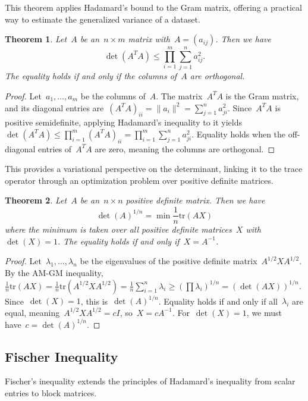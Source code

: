 \documentclass[12pt]{article}
\newtheorem{theorem}{Theorem}[section]
\begin{document}
\noindent This theorem applies Hadamard's bound to the Gram matrix, offering a practical way to estimate the generalized variance of a dataset.
\begin{theorem}
Let~$A$ be an~$n \times m$ matrix with~$A = (a_{ij})$. Then we have
\[ \det(A^T A) \le \prod_{i=1}^m \sum_{j=1}^n a_{ij}^2. \]
The equality holds if and only if the columns of~$A$ are orthogonal.
\end{theorem}
\begin{proof}
Let~$a_1, \dots, a_m$ be the columns of~$A$. The matrix~$A^T A$ is the Gram matrix, and its diagonal entries are~$(A^T A)_{ii} = \|a_i\|^2 = \sum_{j=1}^n a_{ji}^2$. Since~$A^T A$ is positive semidefinite, applying Hadamard's inequality to it yields~$\det(A^T A) \le \prod_{i=1}^m (A^T A)_{ii} = \prod_{i=1}^m \sum_{j=1}^n a_{ji}^2$. Equality holds when the off-diagonal entries of~$A^T A$ are zero, meaning the columns are orthogonal.
\end{proof}

\noindent This provides a variational perspective on the determinant, linking it to the trace operator through an optimization problem over positive definite matrices.
\begin{theorem}
Let~$A$ be an~$n \times n$ positive definite matrix. Then we have
\[ \det(A)^{1/n} = \min \frac{1}{n} \text{tr}(AX) \]
where the minimum is taken over all positive definite matrices~$X$ with~$\det(X) = 1$. The equality holds if and only if~$X = A^{-1}$.
\end{theorem}
\begin{proof}
Let~$\lambda_1, \dots, \lambda_n$ be the eigenvalues of the positive definite matrix~$A^{1/2}XA^{1/2}$. By the AM-GM inequality,~$\frac{1}{n} \text{tr}(AX) = \frac{1}{n} \text{tr}(A^{1/2}XA^{1/2}) = \frac{1}{n} \sum_{i=1}^n \lambda_i \ge (\prod \lambda_i)^{1/n} = (\det(AX))^{1/n}$. Since~$\det(X)=1$, this is~$\det(A)^{1/n}$. Equality holds if and only if all~$\lambda_i$ are equal, meaning~$A^{1/2}XA^{1/2} = cI$, so~$X = cA^{-1}$. For~$\det(X)=1$, we must have~$c = \det(A)^{1/n}$.
\end{proof}

\subsection{Fischer Inequality}
Fischer's inequality extends the principles of Hadamard's inequality from scalar entries to block matrices.
\end{document}

